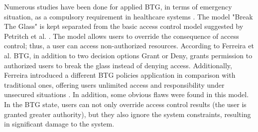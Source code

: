 Numerous studies have been done for applied BTG, in terms of emergency situation, as a compulsory requirement in healthcare systems \cite{joint2004cocir}.
The model "Break The Glass" is kept separated from the basic access control model suggested by Petritch et al. \cite{petritsch2014generic}. 
The model allows users to override the consequence of access control; thus, a user can access non-authorized resources. 
According to Ferreira et al. \cite{ferreira2009securely} BTG, in addition to two decision options Grant or Deny, grants permission to authorized users to break the glass instead of denying access.
Additionally, Ferreira introduced a different BTG policies application in comparison with traditional ones, offering users unlimited access and responsibility under unsecured situations \cite{ferreira2006break}.
In addition, some obvious flaws were found in this model. 
In the BTG state, users can not only override access control results (the user is granted greater authority), but they also ignore the system constraints, resulting in significant damage to the system. 


